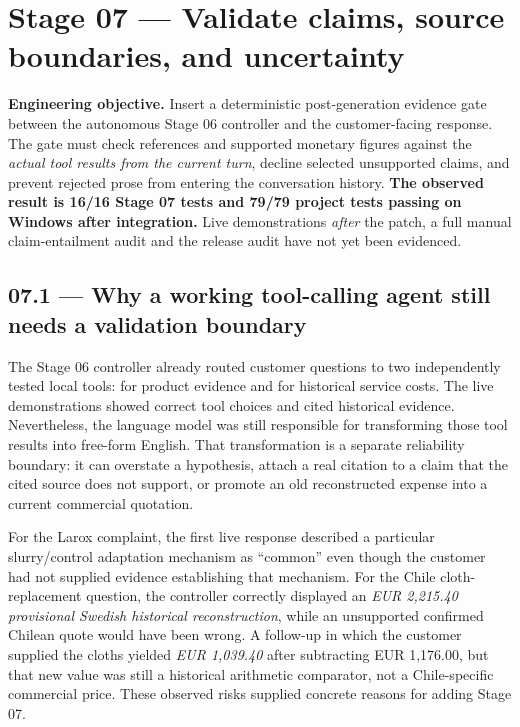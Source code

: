 \documentclass[11pt,a4paper]{article}
\DeclareRobustCommand{\code}[1]{{\ttfamily\small\detokenize{#1}}}
\begin{document}
\clearpage
\section{Stage 07 --- Validate claims, source boundaries, and uncertainty}
\begin{keybox}
\textbf{Engineering objective.} Insert a deterministic post-generation evidence gate between the autonomous Stage 06 controller and the customer-facing response. The gate must check references and supported monetary figures against the \emph{actual tool results from the current turn}, decline selected unsupported claims, and prevent rejected prose from entering the conversation history. \textbf{The observed result is 16/16 Stage 07 tests and 79/79 project tests passing on Windows after integration.} Live demonstrations \emph{after} the patch, a full manual claim-entailment audit and the release audit have not yet been evidenced.
\end{keybox}

\subsection{07.1 --- Why a working tool-calling agent still needs a validation boundary}
The Stage 06 controller already routed customer questions to two independently tested local tools: \code{search_product_brochures} for product evidence and \code{compare_service_costs} for historical service costs. The live demonstrations showed correct tool choices and cited historical evidence. Nevertheless, the language model was still responsible for transforming those tool results into free-form English. That transformation is a separate reliability boundary: it can overstate a hypothesis, attach a real citation to a claim that the cited source does not support, or promote an old reconstructed expense into a current commercial quotation.

For the Larox complaint, the first live response described a particular slurry/control adaptation mechanism as ``common'' even though the customer had not supplied evidence establishing that mechanism. For the Chile cloth-replacement question, the controller correctly displayed an \emph{EUR 2,215.40 provisional Swedish historical reconstruction}, while an unsupported confirmed Chilean quote would have been wrong. A follow-up in which the customer supplied the cloths yielded \emph{EUR 1,039.40} after subtracting EUR 1,176.00, but that new value was still a historical arithmetic comparator, not a Chile-specific commercial price. These observed risks supplied concrete reasons for adding Stage 07.
\end{document}
